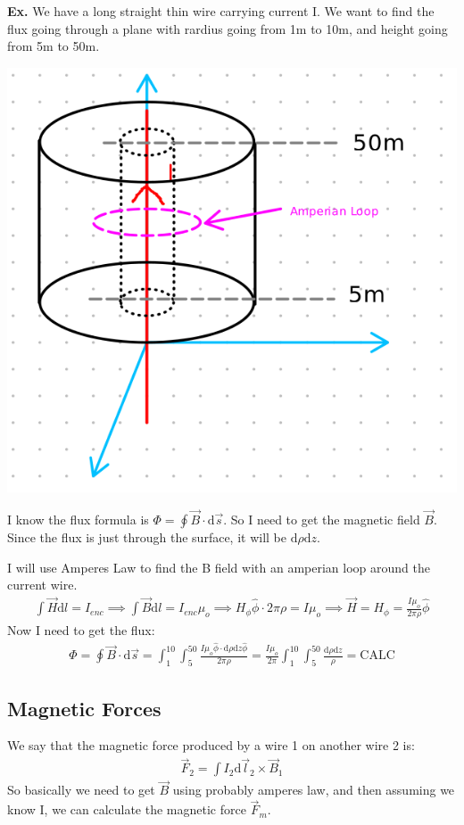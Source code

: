 \documentclass[12pt,letterpaper]{article} \usepackage{amsmath} \usepackage{graphicx} \usepackage[margin=1in]{geometry} \usepackage{longtable}  \usepackage{amssymb}
\begin{document}
	\begin{mdframed}
		\textbf{Ex. } We have a long straight thin wire carrying current I. We want to find the flux going through a plane with rardius going from 1m to 10m, and height going from 5m to 50m. 
		\begin{center}
			\includegraphics[width=0.4\linewidth]{ex3}
		\end{center}
		I know the flux formula is $\Phi = \oint \vec B \cdot \mathrm d \vec s$. So I need to get the magnetic field $\vec B$. Since the flux is just through the surface, it will be $\mathrm d \rho \mathrm d z$.

		I will use Amperes Law to find the B field with an amperian loop around the current wire. 
		\begin{align*}
			\int \vec H \mathrm d l = I_{enc} \implies \int \vec B \mathrm d l = I_{enc} \mu_o \implies H_\phi \hat \phi \cdot 2\pi \rho = I\mu_o \implies \vec H = H_\phi = \frac{I\mu_o}{2\pi \rho} \hat \phi
		\end{align*}
		Now I need to get the flux:
		\begin{align*}
			\Phi = \oint \vec B \cdot \mathrm d \vec s = \int_1^{10}\int_5^{50} \frac{I\mu_o \hat \phi \cdot \mathrm d\rho \mathrm d z \hat\phi}{2\pi\rho} = \frac{I\mu_o}{2\pi}\int_1^{10}\int_5^{50}\frac{\mathrm d \rho \mathrm d z}{\rho} = \text{CALC}
		\end{align*}
		
	\end{mdframed}

	\subsection{Magnetic Forces}
	We say that the magnetic force produced by a wire 1 on another wire 2 is: 
	\begin{align*}
		\vec F_2 = \int I_2\mathrm d \vec l_2 \times \vec B_1
	\end{align*}
	So basically we need to get $\vec B$ using probably amperes law, and then assuming we know I, we can calculate the magnetic force $\vec F_m$.
	
\end{document}
